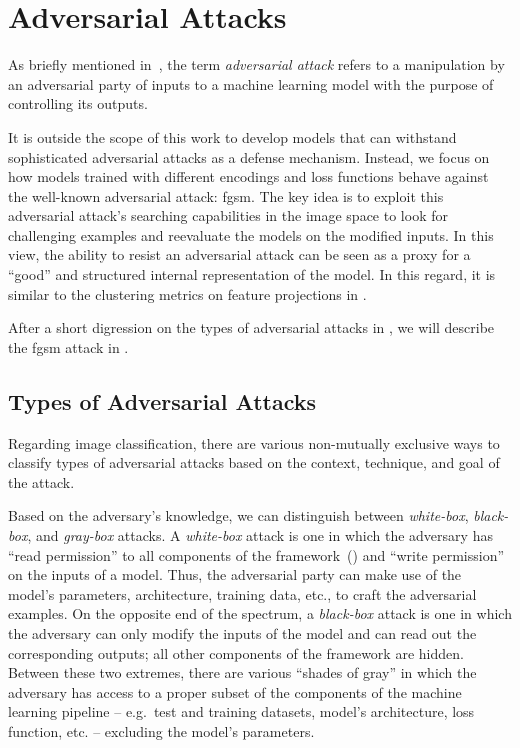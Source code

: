 \section{Adversarial Attacks}
\label{sec:adversarial-attacks-model-evaluation}

As briefly mentioned in~, the term \emph{adversarial attack} refers to a manipulation by an adversarial party of inputs to a machine learning model with the purpose of controlling its outputs.

It is outside the scope of this work to develop models that can withstand sophisticated adversarial attacks as a defense mechanism. Instead, we focus on how models trained with different encodings and loss functions behave against the well-known adversarial attack: \acrfull{fgsm}. The key idea is to exploit this adversarial attack's searching capabilities in the image space to look for challenging examples and reevaluate the models on the modified inputs. In this view, the ability to resist an adversarial attack can be seen as a proxy for a ``good'' and structured internal representation of the model. In this regard, it is similar to the clustering metrics on feature projections in .

After a short digression on the types of adversarial attacks in , we will describe the \acrshort{fgsm} attack in .

\subsection{Types of Adversarial Attacks}
\label{subsec:types-adversarial-attacks}
Regarding image classification, there are various non-mutually exclusive ways to classify types of adversarial attacks based on the context, technique, and goal of the attack.

Based on the adversary's knowledge, we can distinguish between \emph{white-box}, \emph{black-box}, and \emph{gray-box} attacks.
A \emph{white-box} attack is one in which the adversary has ``read permission'' to all components of the framework~() and ``write permission'' on the inputs of a model. Thus, the adversarial party can make use of the model's parameters, architecture, training data, etc., to craft the adversarial examples.
On the opposite end of the spectrum, a \emph{black-box} attack is one in which the adversary can only modify the inputs of the model and can read out the corresponding outputs; all other components of the framework are hidden.
Between these two extremes, there are various ``shades of gray'' in which the adversary has access to a proper subset of the components of the machine learning pipeline -- e.g.\ test and training datasets, model's architecture, loss function, etc. -- excluding the model's parameters.

